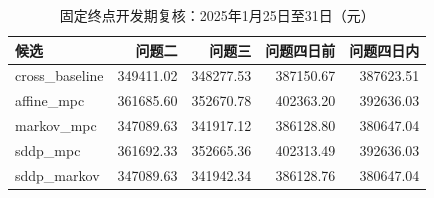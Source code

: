 \begin{table}[htbp]\centering\small
\caption{固定终点开发期复核：2025年1月25日至31日（元）}
\begin{tabular}{lrrrr}
\toprule
候选 & 问题二 & 问题三 & 问题四日前 & 问题四日内 \\
\midrule
cross\_baseline & 349411.02 & 348277.53 & 387150.67 & 387623.51 \\
affine\_mpc & 361685.60 & 352670.78 & 402363.20 & 392636.03 \\
markov\_mpc & 347089.63 & 341917.12 & 386128.80 & 380647.04 \\
sddp\_mpc & 361692.33 & 352665.36 & 402313.49 & 392636.03 \\
sddp\_markov & 347089.63 & 341942.34 & 386128.76 & 380647.04 \\
\bottomrule\end{tabular}\end{table}
